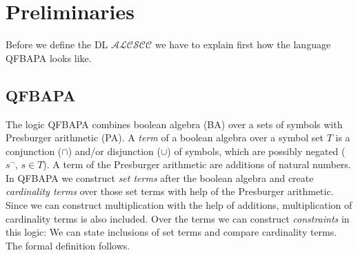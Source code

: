 \documentclass{book}
\theoremstyle{break}
\theoremstyle{definition}
\begin{document}
\chapter{Preliminaries}
Before we define the DL $\mathcal{ALCSCC}$ we have to explain first how the language QFBAPA looks like. 
\section{QFBAPA}
The logic QFBAPA \cite{KuncakRinard} combines boolean algebra (BA) over a sets of symbols with Presburger arithmetic (PA). A \textit{term} of a boolean algebra over a symbol set $T$ is a conjunction ($\cap$) and/or disjunction ($\cup$) of symbols, which are possibly negated ($s^\neg$, $s\in T$). A term of the Presburger arithmetic are additions of natural numbers. In QFBAPA we construct \textit{set terms} after the boolean algebra and create \textit{cardinality terms} over those set terms with help of the Presburger arithmetic. Since we can construct multiplication with the help of additions, multiplication of cardinality terms is also included. Over the terms we can construct \textit{constraints} in this logic: We can state inclusions of set terms and compare cardinality terms. The formal definition follows.
\end{document}
